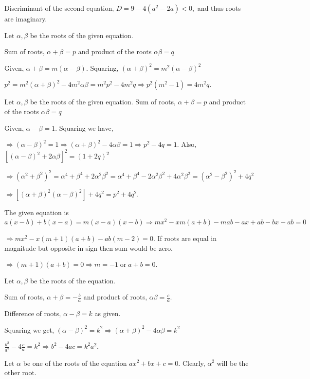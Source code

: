   Discriminant of the second equation, $D = 9 - 4(a^2 - 2a) < 0,$ and thus roots are imaginary.
\item Let $\alpha, \beta$ be the roots of the given equation.

  Sum of roots, $\alpha + \beta = p$ and product of the roots $\alpha\beta = q$

  Given, $\alpha + \beta = m(\alpha - \beta)$. Squaring, $(\alpha + \beta)^2 = m^2(\alpha - \beta)^2$

  $p^2 = m^2(\alpha + \beta)^2 - 4m^2\alpha\beta = m^2p^2 - 4m^2q \Rightarrow p^2(m^2 - 1) = 4m^2q$.
\item Let $\alpha, \beta$ be the roots of the given equation. Sum of roots, $\alpha + \beta = p$ and product
  of the roots $\alpha\beta = q$

  Given, $\alpha - \beta = 1$. Squaring we have,

  $\Rightarrow (\alpha - \beta)^2 = 1 \Rightarrow (\alpha + \beta)^2 - 4\alpha\beta = 1\Rightarrow p^2 - 4q = 1$. Also,
  $[(\alpha - \beta)^2 + 2\alpha\beta]^2 = (1 + 2q)^2$

  $\Rightarrow (\alpha^2 + \beta^2)^2 = \alpha^4 + \beta^4 + 2\alpha^2\beta^2= \alpha^4 + \beta^4 - 2\alpha^2\beta^2 +
  4\alpha^2\beta^2 = (\alpha^2 - \beta^2)^2 + 4q^2$

  $\Rightarrow [(\alpha + \beta)^2(\alpha - \beta)^2] + 4q^2 = p^2 + 4q^2$.
\item The given equation is $a(x - b) + b(x - a) = m(x - a)(x - b)\Rightarrow mx^2 - xm(a + b) - mab - ax +
  ab - bx + ab = 0$

  $\Rightarrow mx^2 - x(m + 1)(a + b) - ab(m - 2) = 0$. If roots are equal in magnitude but opposite in sign
  then sum would be zero.

  $\Rightarrow (m + 1)(a + b) = 0 \Rightarrow m = -1\;\text{or}\;a + b = 0$.
\item Let $\alpha, \beta$ be the roots of the equation.

  Sum of roots, $\alpha + \beta = -\frac{b}{a}$ and product of roots, $\alpha\beta = \frac{c}{a}$.

  Difference of roots, $\alpha - \beta = k$ as given.

  Squaring we get, $(\alpha - \beta)^2 = k^2 \Rightarrow (\alpha + \beta)^2 - 4\alpha\beta = k^2$

  $\frac{b^2}{a^2} - 4\frac{c}{a} = k^2 \Rightarrow b^2 - 4ac = k^2a^2$.
\item Let $\alpha$ be one of the roots of the equation $ax^2 + bx + c = 0$. Clearly, $\alpha^2$ will be the other root.

